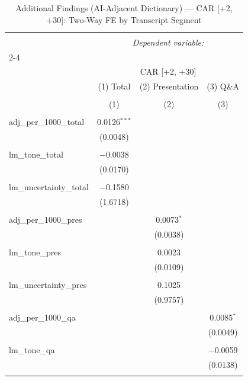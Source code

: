 
\begin{table}[!htbp] \centering 
  \caption{Additional Findings (AI-Adjacent Dictionary) — CAR [+2, +30]: Two-Way FE by Transcript Segment} 
  \label{} 
\begin{tabular}{@{\extracolsep{5pt}}lccc} 
\\[-1.8ex]\hline 
\hline \\[-1.8ex] 
 & \multicolumn{3}{c}{\textit{Dependent variable:}} \\ 
\cline{2-4} 
\\[-1.8ex] & \multicolumn{3}{c}{CAR [+2, +30]} \\ 
 & (1) Total & (2) Presentation & (3) Q\&A \\ 
\\[-1.8ex] & (1) & (2) & (3)\\ 
\hline \\[-1.8ex] 
 adj\_per\_1000\_total & 0.0126$^{***}$ &  &  \\ 
  & (0.0048) &  &  \\ 
  & & & \\ 
 lm\_tone\_total & $-$0.0038 &  &  \\ 
  & (0.0170) &  &  \\ 
  & & & \\ 
 lm\_uncertainty\_total & $-$0.1580 &  &  \\ 
  & (1.6718) &  &  \\ 
  & & & \\ 
 adj\_per\_1000\_pres &  & 0.0073$^{*}$ &  \\ 
  &  & (0.0038) &  \\ 
  & & & \\ 
 lm\_tone\_pres &  & 0.0023 &  \\ 
  &  & (0.0109) &  \\ 
  & & & \\ 
 lm\_uncertainty\_pres &  & 0.1025 &  \\ 
  &  & (0.9757) &  \\ 
  & & & \\ 
 adj\_per\_1000\_qa &  &  & 0.0085$^{*}$ \\ 
  &  &  & (0.0049) \\ 
  & & & \\ 
 lm\_tone\_qa &  &  & $-$0.0059 \\ 
  &  &  & (0.0138) \\ 
  & & & \\ 

\end{tabular}
\end{table}
